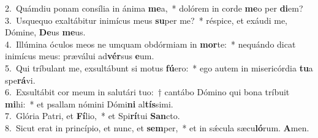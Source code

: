 {2.~}Quámdiu ponam consília in ánima \textbf{me}a,~* dolórem in corde \textbf{me}o per \textbf{di}em?\\
{3.~}Usquequo exaltábitur inimícus meus \textbf{su}per me?~* réspice, et exáudi me, Dómine, \textbf{De}us \textbf{me}us.\\
{4.~}Illúmina óculos meos ne umquam obdórmiam in \textbf{mor}te:~* nequándo dicat inimícus meus: præválui ad\textbf{vér}sus \textbf{e}um.\\
{5.~}Qui tríbulant me, exsultábunt si motus \textbf{fú}ero:~* ego autem in misericórdia \textbf{tu}a spe\textbf{rá}vi.\\
{6.~}Exsultábit cor meum in salutári tuo:~† cantábo Dómino qui bona tríbuit \textbf{mi}hi:~* et psallam nómini Dómi\textbf{ni} al\textbf{tís}simi.\\
{7.~}Glória Patri, et \textbf{Fí}lio,~* et Spi\textbf{rí}tui \textbf{San}cto.\\
{8.~}Sicut erat in princípio, et nunc, et \textbf{sem}per,~* et in sǽcula sæcu\textbf{ló}rum. \textbf{A}men.\\
